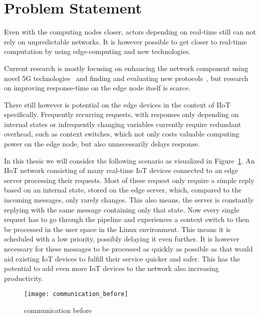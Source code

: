 \section{Problem Statement}

Even with the computing nodes closer, actors depending on real-time still can
not rely on unpredictable networks. It is however possible to get closer to
real-time computation by using edge-computing and new technologies.

Current research is mostly focusing on enhancing the network component using
novel 5G technologies~\cite{nunna_enabling_2015} and finding and evaluating new
protocols~\cite{suriyachai_survey_2012}, but research on improving response-time
on the edge node itself is scarce.

There still however is potential on the edge devices in the context of IIoT
specifically. Frequently recurring requests, with responses only depending on
internal states or infrequently changing variables currently require redundant
overhead, such as context switches, which not only costs valuable computing
power on the edge node, but also unnecessarily delays response.

In this thesis we will consider the following scenario as visualized in
Figure~\ref{fig:communication_before}. An IIoT network consisting of many
real-time IoT devices connected to an edge server processing their requests.
Most of these request only require a simple reply based on an internal state,
stored on the edge server, which, compared to the incoming messages, only rarely
changes. This also means, the server is constantly replying with the same
message containing only that state. Now every single request has to go through
the pipeline and experiences a context switch to then be processed in the user
space in the Linux environment. This means it is scheduled with a low priority,
possibly delaying it even further. It is however necessary for these messages to
be processed as quickly as possible as that would aid existing IoT devices to
fulfill their service quicker and safer. This has the potential to add even more
IoT devices to the network also increasing productivity.

\begin{figure}[htpb]
       \centering
       \texttt{[image: communication\_before]}
       \caption{communication before%
       \label{fig:communication_before}}%
\end{figure}
